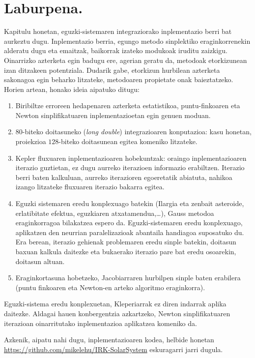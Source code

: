 \section{Laburpena.}


Kapitulu honetan, eguzki-sistemaren integraziorako inplementazio berri bat aurkeztu dugu. Inplementazio berria, egungo metodo sinplektiko eraginkorrenekin alderatu dugu eta emaitzak, baikorrak izateko modukoak iruditu zaizkigu. Oinarrizko azterketa egin badugu ere, agerian geratu da, metodoak etorkizunean izan ditzakeen potentziala. Dudarik gabe, etorkizun hurbilean azterketa sakonagoa egin beharko litzateke, metodoaren propietate onak baieztatzeko. Horien artean, honako ideia aipatuko ditugu:
\begin{enumerate}
\item Biribiltze erroreen hedapenaren azterketa estatistikoa, puntu-finkoaren eta Newton sinplifikatuaren inplementazioetan egin genuen moduan.
\item $80$-biteko doitasuneko (\emph{long double}) integrazioaren konputazioa: kasu honetan, proiekzioa $128$-biteko doitasunean egitea komeniko litzateke. 
\item Kepler fluxuaren inplementazioaren hobekuntzak: oraingo inplementazioaren iterazio guztietan, ez dugu aurreko iterazioen informazio erabiltzen. Iterazio berri baten kalkuluan, aurreko iterazioren egoeretatik abiatuta, nahikoa izango litzateke fluxuaren iterazio bakarra egitea.  
\item Eguzki sistemaren eredu konplexuago batekin (Ilargia eta zenbait asteroide, erlatibitate efektua, eguzkiaren atxatamendua,\dots), Gauss metodoa eraginkorragoa bilakatzea espero da. Eguzki-sistemaren eredu konplexuago, aplikatzen den neurrian paralelizazioak abantaila handiagoa suposatuko du. Era berean, iterazio gehienak problemaren eredu sinple batekin, doitasun baxuan kalkula daitezke eta bukaerako iterazio pare bat eredu osoarekin, doitasun altuan.
\item Eraginkortasuna hobetzeko, Jacobiarraren hurbilpen sinple baten erabilera (puntu finkoaren eta Newton-en arteko algoritmo eraginkorra).  
\end{enumerate}    

Eguzki-sistema eredu konplexuetan, Kleperiarrak ez diren indarrak aplika daitezke. Aldagai hauen konbergentzia azkartzeko, Newton sinplifikatuaren iterazioan oinarritutako inplementazioa aplikatzea komeniko da.  

Azkenik, aipatu nahi dugu, inplementazioaren kodea, helbide honetan \url{https://github.com/mikelehu/IRK-SolarSystem} eskuragarri jarri dugula. 


